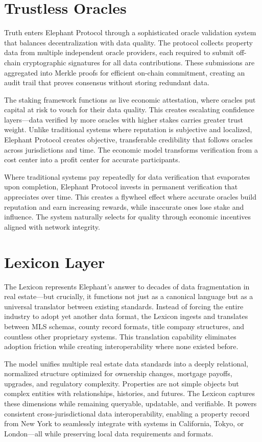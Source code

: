 \section{Trustless Oracles}

Truth enters Elephant Protocol through a sophisticated oracle validation system that balances decentralization with data quality. The protocol collects property data from multiple independent oracle providers, each required to submit off-chain cryptographic signatures for all data contributions. These submissions are aggregated into Merkle proofs for efficient on-chain commitment, creating an audit trail that proves consensus without storing redundant data.

The staking framework functions as live economic attestation, where oracles put capital at risk to vouch for their data quality. This creates escalating confidence layers---data verified by more oracles with higher stakes carries greater trust weight. Unlike traditional systems where reputation is subjective and localized, Elephant Protocol creates objective, transferable credibility that follows oracles across jurisdictions and time. The economic model transforms verification from a cost center into a profit center for accurate participants.

Where traditional systems pay repeatedly for data verification that evaporates upon completion, Elephant Protocol invests in permanent verification that appreciates over time. This creates a flywheel effect where accurate oracles build reputation and earn increasing rewards, while inaccurate ones lose stake and influence. The system naturally selects for quality through economic incentives aligned with network integrity.

\section{Lexicon Layer}

The Lexicon represents Elephant's answer to decades of data fragmentation in real estate---but crucially, it functions not just as a canonical language but as a universal translator between existing standards. Instead of forcing the entire industry to adopt yet another data format, the Lexicon ingests and translates between MLS schemas, county record formats, title company structures, and countless other proprietary systems. This translation capability eliminates adoption friction while creating interoperability where none existed before.

The model unifies multiple real estate data standards into a deeply relational, normalized structure optimized for ownership changes, mortgage payoffs, upgrades, and regulatory complexity. Properties are not simple objects but complex entities with relationships, histories, and futures. The Lexicon captures these dimensions while remaining queryable, updatable, and verifiable. It powers consistent cross-jurisdictional data interoperability, enabling a property record from New York to seamlessly integrate with systems in California, Tokyo, or London---all while preserving local data requirements and formats.

